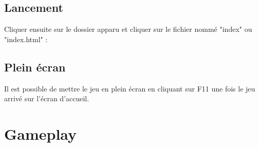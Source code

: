 \documentclass{article}
\begin{document}
\subsection{Lancement}
Cliquer ensuite sur le dossier apparu et cliquer sur le fichier nommé "index" ou "index.html" :
\vspace{0.5cm}\\
\subsection{Plein écran}
Il est possible de mettre le jeu en plein écran en cliquant sur F11 une fois le jeu arrivé sur l'écran d'accueil. 

\newpage
\section{Gameplay}
\end{document}

